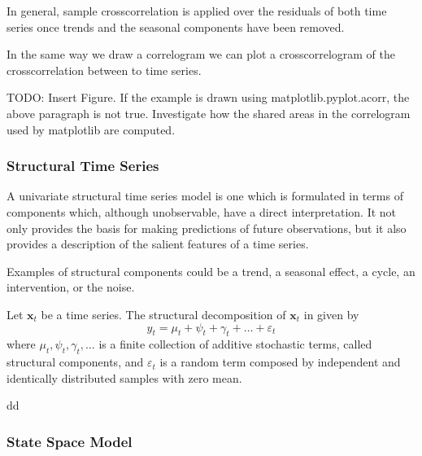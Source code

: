 In general, sample crosscorrelation is applied over the residuals of both time series once trends and the seasonal components have been removed.

In the same way we draw a correlogram we can plot a crosscorrelogram of the crosscorrelation between to time series.

\begin{example}
{\color {red} TODO: Insert Figure. If the example is drawn using matplotlib.pyplot.acorr, the above paragraph is not true. Investigate how the shared areas in the correlogram used by matplotlib are computed.}
\end{example}


\subsubsection{Structural Time Series}

{\color{red} A univariate structural time series model is one which is formulated in terms of components which, although unobservable, have a direct interpretation. It not only provides the basis for making predictions of future observations, but it also provides a description of the salient features of a time series.}

Examples of structural components could be a trend, a seasonal effect, a cycle, an intervention, or the noise.

\begin{definition}
Let $\mathbf{x}_t$ be a time series. The structural decomposition of $\mathbf{x}_t$ in given by
\[
y_t = \mu_t + \psi_t + \gamma_t + \ldots + \varepsilon_t
\]
where $\mu_t, \psi_t, \gamma_t, \ldots$ is a finite collection of additive stochastic terms, called structural components, and $\varepsilon_t$ is a random term composed by independent and identically distributed samples with zero mean. 
\end{definition}

\begin{example}
dd
\end{example}

\subsubsection{State Space Model}

